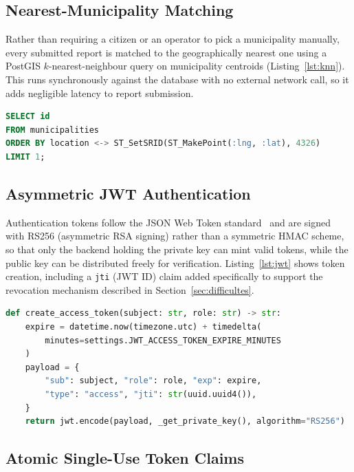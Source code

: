 \subsection{Nearest-Municipality Matching}

Rather than requiring a citizen or an operator to pick a municipality manually, every submitted report is matched to the geographically nearest one using a PostGIS $k$-nearest-neighbour query on municipality centroids (Listing~\ref{lst:knn}). This runs synchronously against the database with no external network call, so it adds negligible latency to report submission.

\begin{lstlisting}[language=SQL, caption={Nearest-municipality query (PostGIS KNN operator)}, label={lst:knn}]
SELECT id
FROM municipalities
ORDER BY location <-> ST_SetSRID(ST_MakePoint(:lng, :lat), 4326)
LIMIT 1;
\end{lstlisting}

\subsection{Asymmetric JWT Authentication}

Authentication tokens follow the JSON Web Token standard~\cite{rfc7519} and are signed with RS256 (asymmetric RSA signing) rather than a symmetric HMAC scheme, so that only the backend holding the private key can mint valid tokens, while the public key can be distributed freely for verification. Listing~\ref{lst:jwt} shows token creation, including a \texttt{jti} (JWT ID) claim added specifically to support the revocation mechanism described in Section~\ref{sec:difficultes}.

\begin{lstlisting}[language=Python, caption={Access token creation with a revocation-capable jti claim}, label={lst:jwt}]
def create_access_token(subject: str, role: str) -> str:
    expire = datetime.now(timezone.utc) + timedelta(
        minutes=settings.JWT_ACCESS_TOKEN_EXPIRE_MINUTES
    )
    payload = {
        "sub": subject, "role": role, "exp": expire,
        "type": "access", "jti": str(uuid.uuid4()),
    }
    return jwt.encode(payload, _get_private_key(), algorithm="RS256")
\end{lstlisting}

\subsection{Atomic Single-Use Token Claims}

